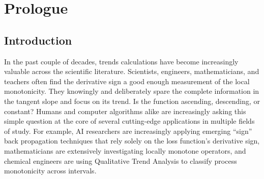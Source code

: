 \documentclass[11pt]{book}
\begin{document}



\pagestyle{empty} %

\tableofcontents %

\cleardoublepage %

\pagestyle{fancy} %



\part{Prologue}

\renewcommand\nomgroup[1]{%
  \item[\bfseries
  \ifstrequal{#1}{P}{Physics constants}{%
  \ifstrequal{#1}{N}{Number sets}{%
  \ifstrequal{#1}{M}{Mathematical Operators}{%
  \ifstrequal{#1}{O}{Other symbols}{}}}}%
]}

\chapter{Introduction}

In the past couple of decades, trends calculations have become increasingly valuable across the scientific literature. Scientists, engineers, mathematicians, and teachers often find the derivative sign a good enough measurement of the local monotonicity. They knowingly and deliberately spare the complete information in the tangent slope and focus on its trend. Is the function ascending, descending, or constant? Humans and computer algorithms alike are increasingly asking this simple question at the core of several cutting-edge applications in multiple fields of study. 
For example, AI researchers are increasingly applying emerging “sign”
back propagation techniques that rely solely on the loss function's
derivative sign, mathematicians are extensively investigating locally
monotone operators, and chemical engineers are using Qualitative
Trend Analysis to classify process monotonicity across intervals.
\end{document}
